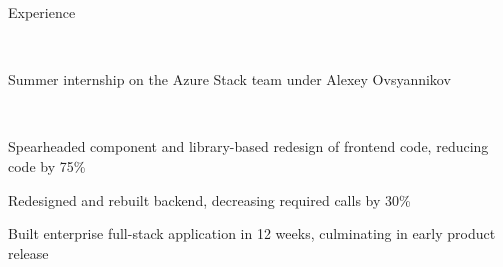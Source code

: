 \documentclass{resume} %
\begin{document}
\begin{rSection}{Experience}

\company{\microsoft}{\la} \\
 \smallskip
\begin{rList}
\item Summer internship on the Azure Stack team under Alexey Ovsyannikov
\end{rList}
\vspace{0.5em}


\company{\lefttravel}{\la} \\
 \smallskip
\begin{rList}
\item Spearheaded component and library-based redesign of frontend code, 
    reducing code by 75\%
\item Redesigned and rebuilt backend, decreasing required calls by 30\%
\item Built enterprise full-stack application in 12 weeks, culminating in early
    product release
\end{rList}
\vspace{0.5em}


\company{\nymbl}{\la} \\

\end{rSection}

\end{document}
